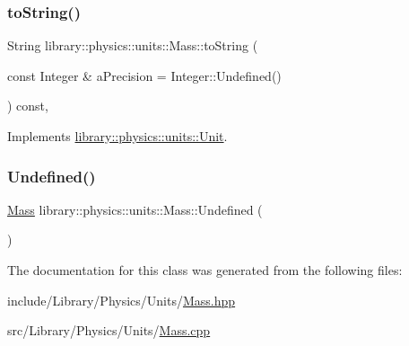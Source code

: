 \subsubsection{\texorpdfstring{to\+String()}{toString()}}
{\footnotesize\ttfamily String library\+::physics\+::units\+::\+Mass\+::to\+String (\begin{DoxyParamCaption}\item[{const Integer \&}]{a\+Precision = {\ttfamily Integer\+:\+:Undefined()} }\end{DoxyParamCaption}) const\hspace{0.3cm}{\ttfamily [override]}, {\ttfamily [virtual]}}



Implements \hyperlink{classlibrary_1_1physics_1_1units_1_1_unit_aac05cb6ed1ea7c18c233a3381c81caf8}{library\+::physics\+::units\+::\+Unit}.

\mbox{\label{classlibrary_1_1physics_1_1units_1_1_mass_af3acc8762e8791a218e877595e94090b}} 
\subsubsection{\texorpdfstring{Undefined()}{Undefined()}}
{\footnotesize\ttfamily \hyperlink{classlibrary_1_1physics_1_1units_1_1_mass}{Mass} library\+::physics\+::units\+::\+Mass\+::\+Undefined (\begin{DoxyParamCaption}{ }\end{DoxyParamCaption})\hspace{0.3cm}{\ttfamily [static]}}



The documentation for this class was generated from the following files\+:\begin{DoxyCompactItemize}
\item 
include/\+Library/\+Physics/\+Units/\hyperlink{_mass_8hpp}{Mass.\+hpp}\item 
src/\+Library/\+Physics/\+Units/\hyperlink{_mass_8cpp}{Mass.\+cpp}\end{DoxyCompactItemize}

